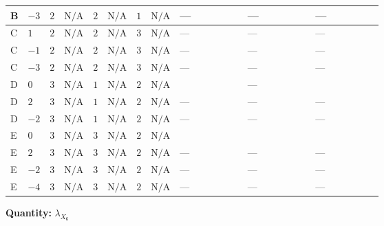 \documentclass[8pt]{article}
\begin{document}
\begin{landscape}
\begin{longtable}{@{}llcccccc >{\raggedright\arraybackslash}p{0.21\linewidth} >{\raggedright\arraybackslash}p{0.21\linewidth} >{\raggedright\arraybackslash}p{0.21\linewidth}@{}}
\midrule
B & $-3$ & $2$ & $\text{N/A}$ & $2$ & $\text{N/A}$ & $1$ & $\text{N/A}$ & --- & --- & --- \\
\midrule
C & $1$ & $2$ & $\text{N/A}$ & $2$ & $\text{N/A}$ & $3$ & $\text{N/A}$ & --- & --- & --- \\
\midrule
C & $-1$ & $2$ & $\text{N/A}$ & $2$ & $\text{N/A}$ & $3$ & $\text{N/A}$ & --- & --- & --- \\
\midrule
C & $-3$ & $2$ & $\text{N/A}$ & $2$ & $\text{N/A}$ & $3$ & $\text{N/A}$ & --- & --- & --- \\
\midrule
D & $0$ & $3$ & $\text{N/A}$ & $1$ & $\text{N/A}$ & $2$ & $\text{N/A}$ & \scriptsize\adjustbox{max width=\linewidth}{$\begin{gathered} +12 {\lambda_{S_1}^{(1)}} {\lambda_{X_{6}}}\end{gathered}$} & --- & \scriptsize\adjustbox{max width=\linewidth}{$\begin{gathered} +11 {\lambda_{X_{9}}}^2\end{gathered}$} \\
\midrule
D & $2$ & $3$ & $\text{N/A}$ & $1$ & $\text{N/A}$ & $2$ & $\text{N/A}$ & --- & --- & --- \\
\midrule
D & $-2$ & $3$ & $\text{N/A}$ & $1$ & $\text{N/A}$ & $2$ & $\text{N/A}$ & --- & --- & --- \\
\midrule
E & $0$ & $3$ & $\text{N/A}$ & $3$ & $\text{N/A}$ & $2$ & $\text{N/A}$ & \scriptsize\adjustbox{max width=\linewidth}{$\begin{gathered} +12 {\lambda_{S_1}^{(1)}} {\lambda_{X_{6}}}\end{gathered}$} & \scriptsize\adjustbox{max width=\linewidth}{$\begin{gathered} +3 {\lambda_{X_{5}}^{(1)}}^2\end{gathered}$} & \scriptsize\adjustbox{max width=\linewidth}{$\begin{gathered} +11 {\lambda_{X_{9}}}^2\end{gathered}$} \\
\midrule
E & $2$ & $3$ & $\text{N/A}$ & $3$ & $\text{N/A}$ & $2$ & $\text{N/A}$ & --- & --- & --- \\
\midrule
E & $-2$ & $3$ & $\text{N/A}$ & $3$ & $\text{N/A}$ & $2$ & $\text{N/A}$ & --- & --- & --- \\
\midrule
E & $-4$ & $3$ & $\text{N/A}$ & $3$ & $\text{N/A}$ & $2$ & $\text{N/A}$ & --- & --- & --- \\
\midrule
\bottomrule
\end{longtable}
\clearpage
\noindent\textbf{Quantity: }${\lambda_{X_{6}}}$\par\smallskip

\end{landscape}
\end{document}
